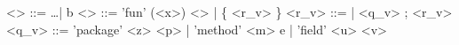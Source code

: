 \documentclass[preview]{standalone}
\begin{document}
\begin{displaygrammar}
<\coreval> ::= \ldots | \langle b \rangle
<\pkgval> ::= 'fun' (<x>) <\pkg> | \{ <r_v> \}
<r_v> ::= \emptyset | <q_v> ; <r_v> 
<q_v> ::= 'package' <z> \eqN <p> | 'method' <m> \eqN e | 'field' <u> \eqN <v>
\end{displaygrammar}
\end{document}
